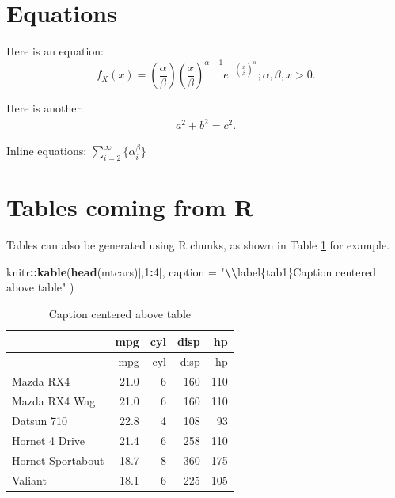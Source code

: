 \documentclass[preprint, 3p,
authoryear]{elsarticle} %
\newenvironment{Shaded}{\begin{snugshade}}{\end{snugshade}}
\newcommand{\AttributeTok}[1]{\textcolor[rgb]{0.13,0.29,0.53}{#1}}
\newcommand{\DecValTok}[1]{\textcolor[rgb]{0.00,0.00,0.81}{#1}}
\newcommand{\FunctionTok}[1]{\textcolor[rgb]{0.13,0.29,0.53}{\textbf{#1}}}
\newcommand{\NormalTok}[1]{#1}
\newcommand{\SpecialCharTok}[1]{\textcolor[rgb]{0.81,0.36,0.00}{\textbf{#1}}}
\newcommand{\StringTok}[1]{\textcolor[rgb]{0.31,0.60,0.02}{#1}}
\begin{document}
\hypertarget{equations}{%
\section{Equations}\label{equations}}

Here is an equation: \[ 
  f_{X}(x) = \left(\frac{\alpha}{\beta}\right)
  \left(\frac{x}{\beta}\right)^{\alpha-1}
  e^{-\left(\frac{x}{\beta}\right)^{\alpha}}; 
  \alpha,\beta,x > 0 .
\]

Here is another: \begin{align}
  a^2+b^2=c^2.
\end{align}

Inline equations: \(\sum_{i = 2}^\infty\{\alpha_i^\beta\}\)

\hypertarget{tables-coming-from-r}{%
\section{Tables coming from R}\label{tables-coming-from-r}}

Tables can also be generated using R chunks, as shown in Table
\ref{tab1} for example.

\begin{Shaded}
\begin{Highlighting}[]
\NormalTok{knitr}\SpecialCharTok{::}\FunctionTok{kable}\NormalTok{(}\FunctionTok{head}\NormalTok{(mtcars)[,}\DecValTok{1}\SpecialCharTok{:}\DecValTok{4}\NormalTok{], }
    \AttributeTok{caption =} \StringTok{"}\SpecialCharTok{\textbackslash{}\textbackslash{}}\StringTok{label\{tab1\}Caption centered above table"}
\NormalTok{)}
\end{Highlighting}
\end{Shaded}

\begin{longtable}[]{@{}lrrrr@{}}
\caption{\label{tab1}Caption centered above table}\tabularnewline
\toprule\noalign{}
& mpg & cyl & disp & hp \\
\midrule\noalign{}
\endfirsthead
\toprule\noalign{}
& mpg & cyl & disp & hp \\
\midrule\noalign{}
\endhead
\bottomrule\noalign{}
\endlastfoot
Mazda RX4 & 21.0 & 6 & 160 & 110 \\
Mazda RX4 Wag & 21.0 & 6 & 160 & 110 \\
Datsun 710 & 22.8 & 4 & 108 & 93 \\
Hornet 4 Drive & 21.4 & 6 & 258 & 110 \\
Hornet Sportabout & 18.7 & 8 & 360 & 175 \\
Valiant & 18.1 & 6 & 225 & 105 \\
\end{longtable}

\renewcommand\refname{References}

\end{document}
